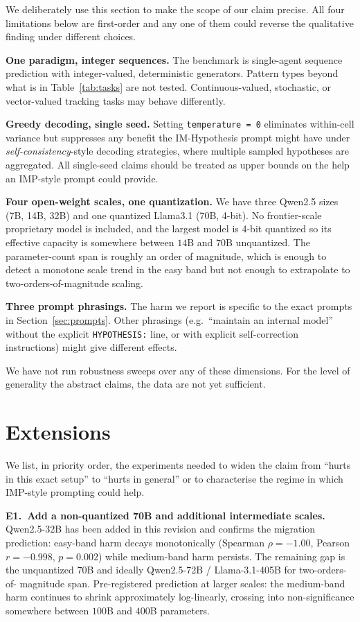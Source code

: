 \documentclass[11pt]{article}
\begin{document}
We deliberately use this section to make the scope of our claim
precise.  All four limitations below are first-order and any one
of them could reverse the qualitative finding under different
choices.

\textbf{One paradigm, integer sequences.}  The benchmark is
single-agent sequence prediction with integer-valued, deterministic
generators.  Pattern types beyond what is in
Table~\ref{tab:tasks} are not tested.  Continuous-valued,
stochastic, or vector-valued tracking tasks may behave
differently.

\textbf{Greedy decoding, single seed.}  Setting
\texttt{temperature\,=\,0} eliminates within-cell variance but
suppresses any benefit
the IM-Hypothesis prompt might have under
\emph{self-consistency}-style decoding strategies, where multiple
sampled hypotheses are aggregated.  All single-seed claims should
be treated as upper bounds on the help an IMP-style prompt could
provide.

\textbf{Four open-weight scales, one quantization.}  We have
three Qwen2.5 sizes (7B, 14B, 32B) and one quantized Llama3.1
(70B, 4-bit).  No frontier-scale proprietary model is included,
and the largest model is 4-bit quantized so its effective capacity
is somewhere between $14$B and $70$B unquantized.  The
parameter-count span is roughly an order of magnitude, which is
enough to detect a monotone scale trend in the easy band but not
enough to extrapolate to two-orders-of-magnitude scaling.

\textbf{Three prompt phrasings.}  The harm we report is specific
to the exact prompts in Section~\ref{sec:prompts}.  Other
phrasings (e.g.\ ``maintain an internal model'' without the
explicit \verb|HYPOTHESIS:| line, or with explicit
self-correction instructions) might give different effects.

We have not run robustness sweeps over any of these dimensions.
For the level of generality the abstract claims, the data are not
yet sufficient.

\section{Extensions}
\label{sec:extensions}

We list, in priority order, the experiments needed to widen the
claim from ``hurts in this exact setup'' to ``hurts in general''
or to characterise the regime in which IMP-style prompting could
help.

\textbf{E1.\ Add a non-quantized 70B and additional intermediate
scales.}  Qwen2.5-32B has been added in this revision and confirms
the migration prediction: easy-band harm decays monotonically
(Spearman $\rho = -1.00$, Pearson $r = -0.998$, $p = 0.002$) while
medium-band harm persists.  The remaining gap is the unquantized
70B and ideally Qwen2.5-72B / Llama-3.1-405B for two-orders-of-
magnitude span.  Pre-registered prediction at larger scales: the
medium-band harm continues to shrink approximately log-linearly,
crossing into non-significance somewhere between $100$B and
$400$B parameters.
\end{document}
